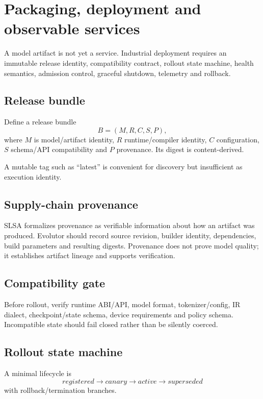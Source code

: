 \chapter{Packaging, deployment and observable services}

A model artifact is not yet a service. Industrial deployment requires an immutable release identity, compatibility contract, rollout state machine, health semantics, admission control, graceful shutdown, telemetry and rollback.

\section{Release bundle}
Define a release bundle
\[
B=(M,R,C,S,P),
\]
where $M$ is model/artifact identity, $R$ runtime/compiler identity, $C$ configuration, $S$ schema/API compatibility and $P$ provenance. Its digest is content-derived.

A mutable tag such as ``latest'' is convenient for discovery but insufficient as execution identity.

\section{Supply-chain provenance}
SLSA formalizes provenance as verifiable information about how an artifact was produced. Evolutor should record source revision, builder identity, dependencies, build parameters and resulting digests. Provenance does not prove model quality; it establishes artifact lineage and supports verification.

\section{Compatibility gate}
Before rollout, verify runtime ABI/API, model format, tokenizer/config, IR dialect, checkpoint/state schema, device requirements and policy schema. Incompatible state should fail closed rather than be silently coerced.

\section{Rollout state machine}
A minimal lifecycle is
\[
registered\rightarrow canary\rightarrow active\rightarrow superseded
\]
with rollback/termination branches.

